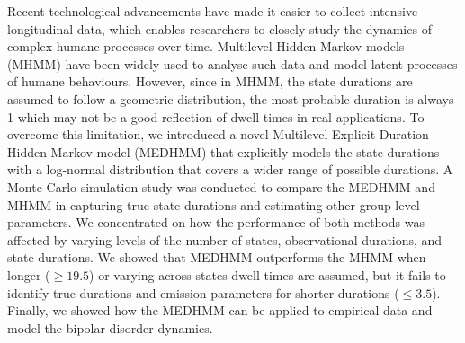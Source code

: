  Recent technological advancements have made it easier to collect intensive longitudinal data, which enables researchers to closely study the dynamics of complex humane processes over time. Multilevel Hidden Markov models (MHMM) have been widely used to analyse such data and model latent processes of humane behaviours. However, since in MHMM, the state durations are assumed to follow a geometric distribution, the most probable duration is always 1 which may not be a good reflection of dwell times in real applications. To overcome this limitation, we introduced a novel Multilevel Explicit Duration Hidden Markov model (MEDHMM) that explicitly models the state durations with a log-normal distribution that covers a wider range of possible durations. A Monte Carlo simulation study was conducted to compare the MEDHMM and MHMM in capturing true state durations and estimating other group-level parameters. We concentrated on how the performance of both methods was affected by varying levels of the number of states, observational durations, and state durations. We showed that MEDHMM outperforms the MHMM when longer ($\geq19.5$) or varying across states dwell times are assumed, but it fails to identify true durations and emission parameters for shorter durations ($\leq3.5$). Finally, we showed how the MEDHMM can be applied to empirical data and model the bipolar disorder dynamics.

 
